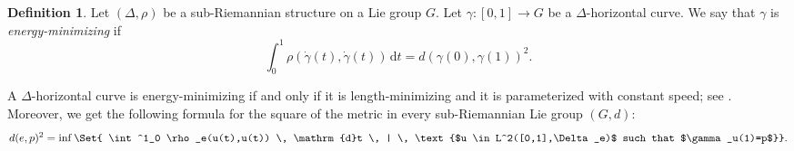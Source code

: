 \documentclass[a4paper,11pt,reqno]{amsart}
\theoremstyle{plain}
\newtheorem{proposition}[theorem]{Proposition}
\theoremstyle{definition}
\newtheorem{definition}[theorem]{Definition}
\newcommand{\id}{e}
\newcommand{\de}{\mathrm{d}}
\newcommand{\coloneq}{\coloneqq}
\begin{document}
\begin{definition} \label{energy}
Let $(\Delta,\rho)$ be a sub-Riemannian structure on a Lie group $G$. Let $\gamma \colon [0,1] \to G$ be a $\Delta$-horizontal curve. We say that $\gamma$ is \emph{energy-minimizing} if 
	\begin{equation} \label{def_minimizing}
	\int^1_0 \rho(\dot{\gamma}(t),\dot{\gamma}(t)) \, \de t= d(\gamma(0),\gamma(1))^2.
 \end{equation} 
 
\end{definition}

A $\Delta$-horizontal curve is energy-minimizing if and only if it is length-minimizing and it is parameterized with constant speed; see \cite[Proposition~3.1.11]{donne2024metricliegroupscarnotcaratheodory}. 
Moreover, we get the following formula for the square of the metric in every sub-Riemannian Lie group $(G,d)$:
\begin{equation} \label{distance_square}
 d(e,p)^2 = \inf \Set{ \int^1_0 \rho_\id(u(t),u(t)) \, \de t \, | \, \text{$u \in L^2([0,1],\Delta_\id)$ such that $\gamma_u(1)=p$}}.
\end{equation}

\end{document}

